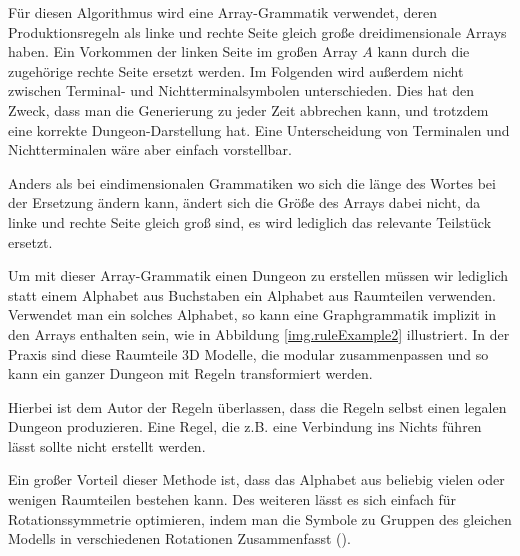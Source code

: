 Für diesen Algorithmus wird eine Array-Grammatik verwendet, deren Produktionsregeln als linke und rechte Seite gleich große dreidimensionale Arrays haben. Ein Vorkommen der linken Seite im großen Array $A$ kann durch die zugehörige rechte Seite ersetzt werden. Im Folgenden wird außerdem nicht zwischen Terminal- und Nichtterminalsymbolen unterschieden. Dies hat den Zweck, dass man die Generierung zu jeder Zeit abbrechen kann, und trotzdem eine korrekte Dungeon-Darstellung hat. Eine Unterscheidung von Terminalen und Nichtterminalen wäre aber einfach vorstellbar.



Anders als bei eindimensionalen Grammatiken wo sich die länge des Wortes bei der Ersetzung ändern kann, ändert sich die Größe des Arrays dabei nicht, da linke und rechte Seite gleich groß sind, es wird lediglich das relevante Teilstück ersetzt.


Um mit dieser Array-Grammatik einen Dungeon zu erstellen müssen wir lediglich statt einem Alphabet aus Buchstaben ein Alphabet aus Raumteilen verwenden. Verwendet man ein solches Alphabet, so kann eine Graphgrammatik implizit in den Arrays enthalten sein, wie in Abbildung \ref{img.ruleExample2} illustriert. In der Praxis sind diese Raumteile 3D Modelle, die modular zusammenpassen und so kann ein ganzer Dungeon mit Regeln transformiert werden.

Hierbei ist dem Autor der Regeln überlassen, dass die Regeln selbst einen legalen Dungeon produzieren. Eine Regel, die z.B. eine Verbindung ins Nichts führen lässt sollte nicht erstellt werden. 

Ein großer Vorteil dieser Methode ist, dass das Alphabet aus beliebig vielen oder wenigen Raumteilen bestehen kann. Des weiteren lässt es sich einfach für Rotationssymmetrie optimieren, indem man die Symbole zu Gruppen des gleichen Modells in verschiedenen Rotationen Zusammenfasst ().


